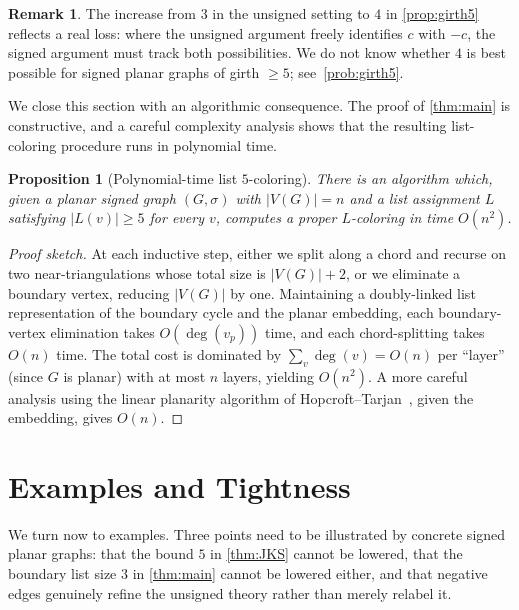 \documentclass[11pt,a4paper]{article}
\theoremstyle{plain}
\newtheorem{proposition}[theorem]{Proposition}
\theoremstyle{definition}
\newtheorem{remark}[theorem]{Remark}
\newcommand{\V}{V}
\newcommand{\Gs}{(G,\sigma)}
\begin{document}
\begin{remark}\label{rmk:girth5}
The increase from $3$ in the unsigned setting to $4$ in
\cref{prop:girth5} reflects a real loss: where the unsigned
argument freely identifies $c$ with $-c$, the signed argument must
track both possibilities. We do not know whether $4$ is best
possible for signed planar graphs of girth $\ge 5$;
see~\cref{prob:girth5}.
\end{remark}

We close this section with an algorithmic consequence. The proof of
\cref{thm:main} is constructive, and a careful complexity analysis
shows that the resulting list-coloring procedure runs in polynomial
time.

\begin{proposition}[Polynomial-time list $5$-coloring]\label{prop:algo}
There is an algorithm which, given a planar signed graph $\Gs$ with
$|\V(G)|=n$ and a list assignment $L$ satisfying $|L(v)|\ge 5$ for
every $v$, computes a proper $L$-coloring in time $O(n^2)$.
\end{proposition}

\begin{proof}[Proof sketch]
At each inductive step, either we split along a chord and recurse
on two near-triangulations whose total size is $|\V(G)|+2$, or we
eliminate a boundary vertex, reducing $|\V(G)|$ by one. Maintaining
a doubly-linked list representation of the boundary cycle and the
planar embedding, each boundary-vertex elimination takes
$O(\deg(v_p))$ time, and each chord-splitting takes $O(n)$ time.
The total cost is dominated by $\sum_{v}\deg(v)=O(n)$ per
``layer'' (since $G$ is planar) with at most $n$ layers, yielding
$O(n^2)$. A more careful analysis using the linear planarity
algorithm of Hopcroft--Tarjan~\cite{HopcroftTarjan1974}, given the
embedding, gives $O(n)$.
\end{proof}

\section{Examples and Tightness}\label{sec:examples}

We turn now to examples. Three points need to be illustrated by
concrete signed planar graphs: that the bound $5$ in
\cref{thm:JKS} cannot be lowered, that the boundary list size $3$
in \cref{thm:main} cannot be lowered either, and that negative
edges genuinely refine the unsigned theory rather than merely
relabel it.
\end{document}
